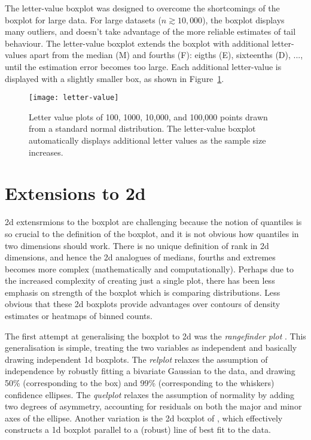 \documentclass[oneside]{article}
\begin{document}
The letter-value boxplot \citep{LV} was designed to overcome the shortcomings of the boxplot for large data. For large datasets ($n \gtrsim 10,000$), the boxplot displays many outliers, and doesn't take advantage of the more reliable estimates of tail behaviour. The letter-value boxplot extends the boxplot with additional letter-values apart from the median (M) and fourths (F): eigths (E), sixteenths (D), ..., until the estimation error becomes too large. Each additional letter-value is displayed with a slightly smaller box, as shown in Figure~\ref{fig:letter-value}.

\begin{figure}[htbp]
  \centering
  \texttt{[image: letter-value]}
  \caption{Letter value plots of 100, 1000, 10,000, and 100,000 points drawn from a standard normal distribution.  The letter-value boxplot automatically displays additional letter values as the sample size increases.}
  \label{fig:letter-value}
\end{figure}

\section{Extensions to 2d}
\label{sec:2d}

2d extensrmions to the boxplot are challenging because the notion of quantiles is so crucial to the definition of the boxplot, and it is not obvious how quantiles in two dimensions should work. There is no unique definition of rank in 2d dimensions, and hence the 2d analogues of medians, fourths and extremes becomes more complex (mathematically and computationally). Perhaps due to the increased complexity of creating just a single plot, there has been less emphasis on strength of the boxplot which is comparing distributions. Less obvious that these 2d boxplots provide advantages over contours of density estimates or heatmaps of binned counts.

The first attempt at generalising the boxplot to 2d was the \emph{rangefinder plot} \citep{rangefinder}. This generalisation is simple, treating the two variables as independent and basically drawing independent 1d boxplots. The \emph{relplot} \citep{Goldberg1992} relaxes the assumption of independence by robustly fitting a bivariate Gaussian to the data, and drawing 50\% (corresponding to the box) and 99\% (corresponding to the whiskers) confidence ellipses. The \emph{quelplot} \citep{Goldberg1992} relaxes the assumption of normality by adding two degrees of asymmetry, accounting for residuals on both the major and minor axes of the ellipse. Another variation is the 2d boxplot of \citet{tongkumchum:2005}, which effectively constructs a 1d boxplot parallel to a (robust) line of best fit to the data.
\end{document}
